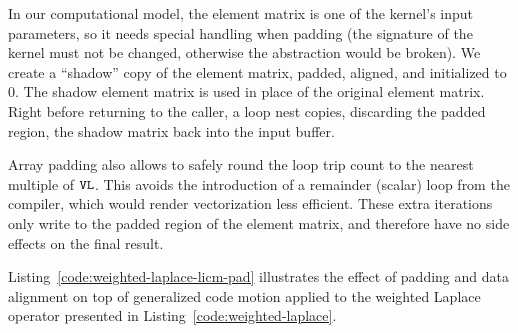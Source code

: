 In our computational model, the element matrix is one of the kernel's input parameters, so it needs special handling when padding (the signature of the kernel must not be changed, otherwise the abstraction would be broken). We create a ``shadow'' copy of the element matrix, padded, aligned, and initialized to 0. The shadow element matrix is used in place of the original element matrix. Right before returning to the caller, a loop nest copies, discarding the padded region, the shadow matrix back into the input buffer.

Array padding also allows to safely round the loop trip count to the nearest multiple of $\mbox{\texttt{VL}}$. This avoids the introduction of a remainder (scalar) loop from the compiler, which would render vectorization less efficient. These extra iterations only write to the padded region of the element matrix, and therefore have no side effects on the final result.

Listing~\ref{code:weighted-laplace-licm-pad} illustrates the effect of padding and data alignment on top of generalized code motion applied to the weighted Laplace operator presented in Listing~\ref{code:weighted-laplace}.

